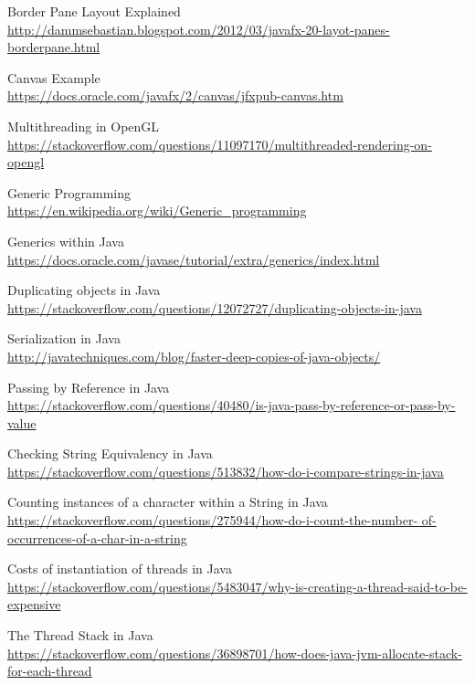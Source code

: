 \documentclass[../../main.tex]{subfiles}
\begin{document}
\begin{thebibliography}{9}
Border Pane Layout Explained\\
\url{http://dammsebastian.blogspot.com/2012/03/javafx-20-layot-panes-borderpane.html}

Canvas Example\\
\url{https://docs.oracle.com/javafx/2/canvas/jfxpub-canvas.htm}

Multithreading in OpenGL\\
\url{https://stackoverflow.com/questions/11097170/multithreaded-rendering-on-opengl}

Generic Programming\\
\url{https://en.wikipedia.org/wiki/Generic_programming}

Generics within Java\\
\url{https://docs.oracle.com/javase/tutorial/extra/generics/index.html}

Duplicating objects in Java\\
\url{https://stackoverflow.com/questions/12072727/duplicating-objects-in-java}

Serialization in Java\\
\url{http://javatechniques.com/blog/faster-deep-copies-of-java-objects/}

Passing by Reference in Java\\
\url{https://stackoverflow.com/questions/40480/is-java-pass-by-reference-or-pass-by-value}

Checking String Equivalency in Java\\
\url{https://stackoverflow.com/questions/513832/how-do-i-compare-strings-in-java}

Counting instances of a character within a String in Java\\
\url{https://stackoverflow.com/questions/275944/how-do-i-count-the-number-
of-occurrences-of-a-char-in-a-string}

Costs of instantiation of threads in Java\\
\url{https://stackoverflow.com/questions/5483047/why-is-creating-a-thread-said-to-be-expensive}

The Thread Stack in Java\\
\url{https://stackoverflow.com/questions/36898701/how-does-java-jvm-allocate-stack-for-each-thread}


\end{thebibliography}
\end{document}

